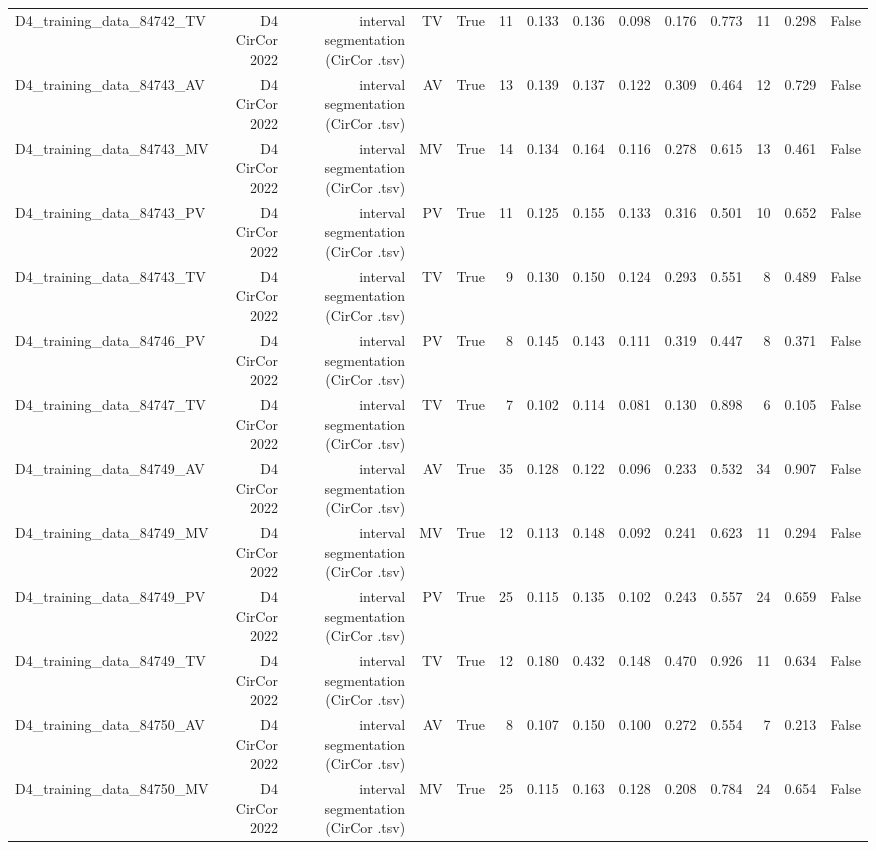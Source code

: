 \begin{table}[htbp]
\begin{tabular}{lrrrrrrrrrrrrr}
    D4\_training\_data\_84742\_TV & D4 CirCor 2022 & interval segmentation (CirCor .tsv) & TV & True & 11 & 0.133 & 0.136 & 0.098 & 0.176 & 0.773 & 11 & 0.298 & False \\
    D4\_training\_data\_84743\_AV & D4 CirCor 2022 & interval segmentation (CirCor .tsv) & AV & True & 13 & 0.139 & 0.137 & 0.122 & 0.309 & 0.464 & 12 & 0.729 & False \\
    D4\_training\_data\_84743\_MV & D4 CirCor 2022 & interval segmentation (CirCor .tsv) & MV & True & 14 & 0.134 & 0.164 & 0.116 & 0.278 & 0.615 & 13 & 0.461 & False \\
    D4\_training\_data\_84743\_PV & D4 CirCor 2022 & interval segmentation (CirCor .tsv) & PV & True & 11 & 0.125 & 0.155 & 0.133 & 0.316 & 0.501 & 10 & 0.652 & False \\
    D4\_training\_data\_84743\_TV & D4 CirCor 2022 & interval segmentation (CirCor .tsv) & TV & True & 9 & 0.130 & 0.150 & 0.124 & 0.293 & 0.551 & 8 & 0.489 & False \\
    D4\_training\_data\_84746\_PV & D4 CirCor 2022 & interval segmentation (CirCor .tsv) & PV & True & 8 & 0.145 & 0.143 & 0.111 & 0.319 & 0.447 & 8 & 0.371 & False \\
    D4\_training\_data\_84747\_TV & D4 CirCor 2022 & interval segmentation (CirCor .tsv) & TV & True & 7 & 0.102 & 0.114 & 0.081 & 0.130 & 0.898 & 6 & 0.105 & False \\
    D4\_training\_data\_84749\_AV & D4 CirCor 2022 & interval segmentation (CirCor .tsv) & AV & True & 35 & 0.128 & 0.122 & 0.096 & 0.233 & 0.532 & 34 & 0.907 & False \\
    D4\_training\_data\_84749\_MV & D4 CirCor 2022 & interval segmentation (CirCor .tsv) & MV & True & 12 & 0.113 & 0.148 & 0.092 & 0.241 & 0.623 & 11 & 0.294 & False \\
    D4\_training\_data\_84749\_PV & D4 CirCor 2022 & interval segmentation (CirCor .tsv) & PV & True & 25 & 0.115 & 0.135 & 0.102 & 0.243 & 0.557 & 24 & 0.659 & False \\
    D4\_training\_data\_84749\_TV & D4 CirCor 2022 & interval segmentation (CirCor .tsv) & TV & True & 12 & 0.180 & 0.432 & 0.148 & 0.470 & 0.926 & 11 & 0.634 & False \\
    D4\_training\_data\_84750\_AV & D4 CirCor 2022 & interval segmentation (CirCor .tsv) & AV & True & 8 & 0.107 & 0.150 & 0.100 & 0.272 & 0.554 & 7 & 0.213 & False \\
    D4\_training\_data\_84750\_MV & D4 CirCor 2022 & interval segmentation (CirCor .tsv) & MV & True & 25 & 0.115 & 0.163 & 0.128 & 0.208 & 0.784 & 24 & 0.654 & False \\

\end{tabular}
\end{table}
